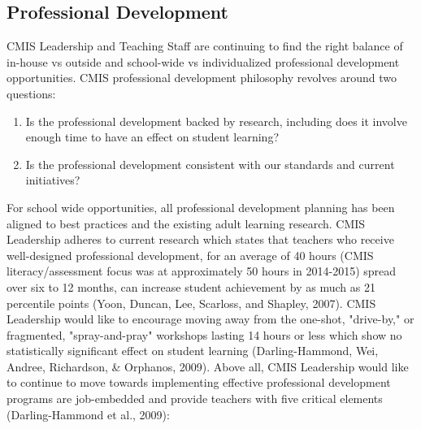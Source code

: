 \documentclass{report}
\begin{document}
\subsection{Professional Development}



\begin{findings}
CMIS Leadership and Teaching Staff are continuing to find the right balance of in-house vs outside and school-wide vs  individualized professional development opportunities. CMIS professional development philosophy revolves around two questions:

\begin{enumerate}
\item Is the professional development backed by research, including does it involve enough time to have an effect on student learning?
\item Is the professional development consistent with our standards and current initiatives? 
\end{enumerate}


For school wide opportunities, all professional development planning has been aligned to best practices and the existing adult learning research. CMIS Leadership adheres to current research which states that teachers who receive well-designed professional development, for an average of 40 hours (CMIS literacy/assessment focus was at approximately 50 hours in 2014-2015) spread over six to 12 months, can increase student achievement by as much as 21 percentile points (Yoon, Duncan, Lee, Scarloss, and Shapley, 2007). CMIS Leadership would like to encourage moving away from the one-shot, "drive-by," or fragmented, "spray-and-pray" workshops lasting 14 hours or less which show no statistically significant effect on student learning (Darling-Hammond, Wei, Andree, Richardson, \& Orphanos, 2009). Above all, CMIS Leadership would like to continue to move towards implementing effective professional development programs are job-embedded and provide teachers with five critical elements (Darling-Hammond et al., 2009):


\end{findings}
\end{document}
